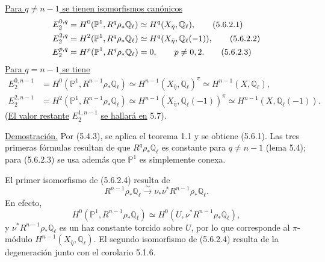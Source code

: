 \underline{Para $q\ne n-1$ se tienen isomorfismos canónicos}
\begin{align}
E_2^{\sisi{o}{0},q}
 &=H^0(\mathbb P^1,R^q\rho_*\mathbb Q_\ell)
 \simeq H^q(X_{\bar\eta},\mathbb Q_\ell),
 \tag{5.6.2.1}\\
E_2^{2,q}
 &=H^2(\mathbb P^1,R^q\rho_*\mathbb Q_\ell)
 \simeq H^q(X_{\bar\eta},\mathbb Q_\ell(-1)),
 \tag{5.6.2.2}\\
E_2^{p,q}
 &=H^p(\mathbb P^1,R^q\rho_*\mathbb Q_\ell)=0,
 \qquad p\ne0,2.
 \tag{5.6.2.3}
\end{align}
\underline{Para $q=n-1$ se tiene}
\begin{align}
E_2^{0,n-1}
 &=H^0(\mathbb P^1,R^{n-1}\rho_*\mathbb Q_\ell)
 \simeq H^{n-1}(X_{\bar\eta},\mathbb Q_\ell)^\pi
 \simeq H^{n-1}(X,\mathbb Q_\ell),
 \tag{5.6.2.4}\\
E_2^{2,n-1}
 &=H^2(\mathbb P^1,R^{n-1}\rho_*\mathbb Q_\ell)
 \simeq H^{n-1}(X_{\bar\eta},\mathbb Q_\ell(-1))^\pi
 \simeq H^{n-1}(X,\mathbb Q_\ell(-1)).
 \tag{5.6.2.5}
\end{align}
(\underline{El valor restante} $E_2^{1,n-1}$ \underline{se hallará en} 5.7).

\noindent\underline{Demostración.}
Por (5.4.3), se aplica el teorema 1.1 y se obtiene (5.6.1). Las tres
primeras fórmulas resultan de que $R^q\rho_*\mathbb Q_\ell$ es constante
para $q\ne n-1$ (lema 5.4); para (5.6.2.3) se usa además que
$\mathbb P^1$ es simplemente conexa.

\pageoriginale

El primer isomorfismo de (5.6.2.4) resulta de
\[
R^{n-1}\rho_*\mathbb Q_\ell
\overset{\sim}{\longrightarrow}
\nu_*\nu^*R^{n-1}\rho_*\mathbb Q_\ell.
\]
En efecto,
\[
H^0(\mathbb P^1,R^{n-1}\rho_*\mathbb Q_\ell)
\simeq H^0(U,\nu^*R^{n-1}\rho_*\mathbb Q_\ell),
\]
y $\nu^*R^{n-1}\rho_*\mathbb Q_\ell$ es un haz constante torcido sobre
$U$, por lo que corresponde al $\pi$-módulo
$H^{n-1}(X_{\bar\eta},\mathbb Q_\ell)$. El segundo isomorfismo de
(5.6.2.4) resulta de la degeneración junto con el corolario 5.1.6.


